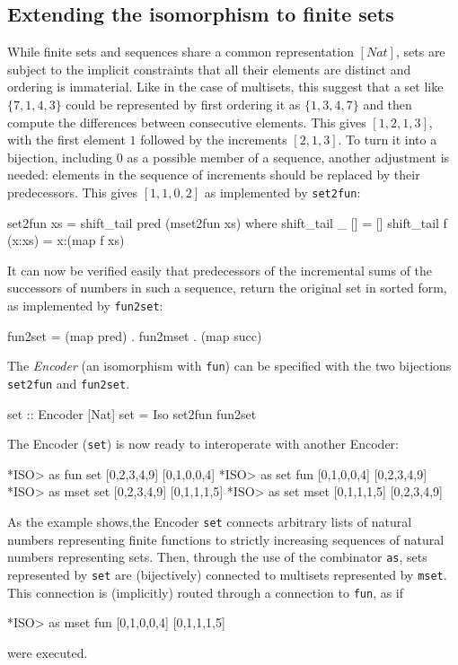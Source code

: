 \documentclass[]{INCLUDES/llncs}
\begin{document}
\subsection{Extending the isomorphism to finite sets} \label{isosets}
While finite sets and sequences share a common representation $[Nat]$,
sets are subject to the implicit constraints that all their elements
are distinct and ordering is immaterial.
Like in the case of multisets, this suggest that a set like $\{7,1,4,3\}$ could
be represented by first ordering it as $\{1,3,4,7\}$ and then compute the 
differences between consecutive elements. This gives $[1,2,1,3]$, with
the first element $1$ followed by the increments $[2,1,3]$. To turn
it into a bijection, including $0$ as a possible member of a sequence,
another adjustment is needed: elements in the sequence of increments should
be replaced by their predecessors. This gives $[1,1,0,2]$ as implemented
by {\tt set2fun}:
\begin{code}
set2fun xs = shift_tail pred (mset2fun xs) where
  shift_tail _ [] = []
  shift_tail f (x:xs) = x:(map f xs)
\end{code}
It can now be verified easily that predecessors of the incremental sums of the
successors of numbers in such a sequence, return the original set
in sorted form, as implemented by {\tt fun2set}:
\begin{code}
fun2set = (map pred) . fun2mset . (map succ)
\end{code}
The {\em Encoder} (an isomorphism with {\tt fun}) can be specified with the two
bijections {\tt set2fun} and {\tt fun2set}.
\begin{code}
set :: Encoder [Nat]
set = Iso set2fun fun2set
\end{code}
The Encoder ({\tt set}) is now ready to interoperate 
with another Encoder:
\begin{codex}
*ISO> as fun set [0,2,3,4,9]
[0,1,0,0,4]
*ISO> as set fun [0,1,0,0,4]
[0,2,3,4,9]
*ISO> as mset set [0,2,3,4,9]
[0,1,1,1,5]
*ISO> as set mset [0,1,1,1,5]
[0,2,3,4,9]
\end{codex}
As the example shows,the Encoder {\tt set} connects arbitrary lists of
natural numbers representing finite functions
to strictly increasing sequences
of natural numbers representing sets.
Then, through the use of the combinator {\tt as}, sets represented by {\tt set}
are (bijectively) connected to multisets represented by {\tt mset}. This
connection is (implicitly) routed through a connection to {\tt fun}, as if
\begin{codex}
*ISO> as mset fun [0,1,0,0,4]
[0,1,1,1,5]
\end{codex}
were executed.
\end{document}
